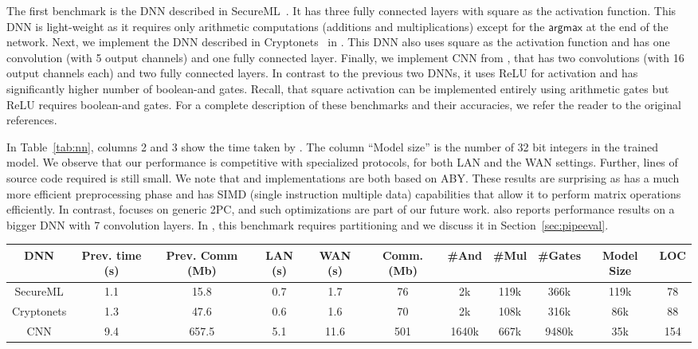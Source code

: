 The first benchmark  is the DNN described in
SecureML~\cite{secureml}.
It has three fully connected layers with square as the activation function.
This DNN is light-weight as it requires only arithmetic computations
(additions and multiplications) 
except for the $\mathsf{argmax}$ at the end of the network.
Next, we implement the DNN described in Cryptonets~\cite{cryptonets}
in \tool.
This DNN also uses square as the activation function and has one
convolution (with 5 output channels) and one fully connected layer. 
Finally, we implement CNN from \minion, that has
two convolutions (with 16 output channels each) and two fully
connected layers.  In contrast to the previous two DNNs, it uses
ReLU for activation and
has significantly higher number of boolean-and gates.
Recall, that square activation can be implemented entirely using
arithmetic gates but ReLU requires boolean-and gates.  For a complete
description of these benchmarks and their accuracies, we refer the
reader to the original references. 

In Table~\ref{tab:nn}, columns 2 and 3 show the time taken by \minion.
The column ``Model size'' is the number of 32 bit integers in the
trained model.
We observe that our performance is competitive with specialized
\minion protocols, for both LAN and the WAN settings. Further, lines
of \tool source code required is still small. 
We note that \minion and \tool implementations are both based on ABY.
These results are surprising as \minion has a much more efficient
preprocessing phase and has SIMD 
(single instruction multiple data) capabilities that allow it to perform
matrix operations efficiently. In contrast, \tool focuses on generic
2PC, and such optimizations are part of our future work.
\minion also reports performance results on a bigger DNN with 7
convolution layers. In \tool, this benchmark requires partitioning and
we discuss it in Section~\ref{sec:pipeeval}.

\begin{table*}
\begin{tabular}{c|c|c|c |c|c|c|c|c|c|c}
DNN  & Prev. time (s) & Prev. Comm (Mb) & LAN (s) & WAN (s) & Comm. (Mb)  & \#And & \#Mul & \#Gates & Model Size & LOC\\
\hline
SecureML   &  1.1 & 15.8 & 0.7 & 1.7  & 76   &  2k   & 119k & 366k   & 119k & 78\\
\hline
Cryptonets &  1.3 & 47.6 & 0.6 & 1.6  & 70    & 2k    & 108k & 316k & 86k & 88\\
\hline
CNN        &  9.4 & 657.5& 5.1 & 11.6 & 501  & 1640k & 667k & 9480k & 35k & 154\\
\hline
\end{tabular}

 \caption{DNN benchmarks. We compare our results (columns 4 , 5, 6) with~\cite{minionn} (columns 2 and 3)}
 \label{tab:nn} 
\end{table*}


